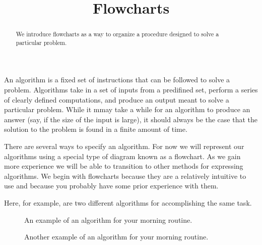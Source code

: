 \documentclass{ximera}
\title{Flowcharts}
\begin{document}
  
\begin{abstract}  
We introduce flowcharts as a way to organize a procedure designed to solve a particular problem.
\end{abstract}  
\maketitle

An algorithm is a fixed set of instructions that can be followed to solve a problem. Algorithms take in a set of inputs from a predifined set, perform a series of clearly defined computations, and produce an output meant to solve a particular problem. While it mmay take a while for an algorithm to produce an answer (say, if the size of the input is large), it should always be the case that the solution to the problem is found in a finite amount of time.

There are several ways to specify an algorithm. For now we will represent our algorithms using a special type of diagram known as a flowchart. As we gain more experience we will be able to transition to other methods for expressing algorithms. We begin with flowcharts because they are a relatively intuitive to use and because you probably have some prior experience with them.

Here, for example, are two different algorithms for accomplishing the same task. 

\begin{figure}[!ht]
	\centering
	\caption{An example of an algorithm for your morning routine.}
\end{figure}

\begin{figure}[!ht]
	\centering
	\caption{Another example of an algorithm for your morning routine.}
\end{figure}
\end{document}

